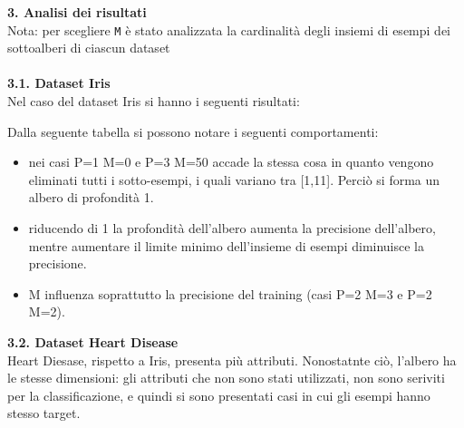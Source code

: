 \documentclass{article}
\begin{document}
{\Large \textbf{3. Analisi dei risultati}}\\
Nota: per scegliere \texttt{M} è stato analizzata la cardinalità degli insiemi di esempi dei sottoalberi di ciascun dataset\\
\\
{\Large \textbf{{\large{3}}.{\small{1}}. Dataset Iris}}\\
Nel caso del dataset Iris si hanno i seguenti risultati:
\begin{table}[H]
\end{table}
Dalla seguente tabella si possono notare i seguenti comportamenti:
\begin{itemize}
	\item nei casi P=1 M=0 e P=3 M=50 accade la stessa cosa in quanto vengono eliminati tutti i sotto-esempi, i quali variano tra [1,11]. Perciò si forma un albero di profondità 1.
	\item riducendo di 1 la profondità dell'albero aumenta la precisione dell'albero, mentre aumentare il limite minimo dell'insieme di esempi diminuisce la precisione.
	\item M influenza soprattutto la precisione del training (casi P=2 M=3 e P=2 M=2).
\end{itemize}
{\Large \textbf{{\large{3}}.{\small{2}}. Dataset Heart Disease}}\\
Heart Diesase, rispetto a Iris, presenta più attributi. Nonostatnte ciò, l'albero ha le stesse dimensioni: gli attributi che non sono stati utilizzati, non sono seriviti per la classificazione, e quindi si sono presentati casi in cui gli esempi hanno stesso target.
\end{document}
